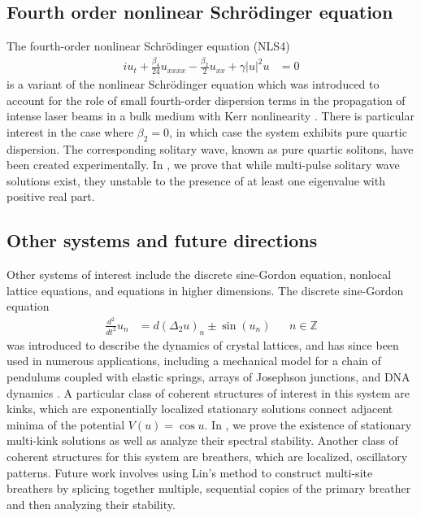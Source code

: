\documentclass[12pt,reqno,oneside,hidelinks]{article}
\begin{document}
\subsection*{Fourth order nonlinear Schr\"odinger equation}

The fourth-order nonlinear Schr{\"o}dinger equation (NLS4) 
\begin{align*}
    i u_t + \frac{\beta_4}{24}u_{xxxx} - \frac{\beta_2}{2}u_{xx} + \gamma |u|^2 u &= 0 
\end{align*}
is a variant of the nonlinear Schr{\"o}dinger equation which was introduced to account for the role of small fourth-order dispersion terms in the propagation of intense laser beams in a bulk medium with Kerr nonlinearity \cite{Karpman2000,Tam2020}. There is particular interest in the case where $\beta_2 = 0$, in which case the system exhibits pure quartic dispersion. The corresponding solitary wave, known as pure quartic solitons, have been created experimentally. In \cite{Parker2020NLS4}, we prove that while multi-pulse solitary wave solutions exist, they unstable to the presence of at least one eigenvalue with positive real part.

\subsection*{Other systems and future directions}

Other systems of interest include the discrete sine-Gordon equation, nonlocal lattice equations, and equations in higher dimensions. The discrete sine-Gordon equation
\begin{align*}
	\frac{d^2}{dt^2}u_n &= d (\Delta_2 u)_n \pm \sin(u_n) && n \in \mathbb{Z}
\end{align*}
was introduced to describe the dynamics of crystal lattices, and has since been used in numerous applications, including a mechanical model for a chain of pendulums coupled with elastic springs, arrays of Josephson junctions, and DNA dynamics \cite{braun2004}. A particular class of coherent structures of interest in this system are kinks, which are exponentially localized stationary solutions connect adjacent minima of the potential $V(u) = \cos u$. In \cite{parkerSG}, we prove the existence of stationary multi-kink solutions as well as analyze their spectral stability. Another class of coherent structures for this system are breathers, which are localized, oscillatory patterns. Future work involves using Lin's method to construct multi-site breathers by splicing together multiple, sequential copies of the primary breather and then analyzing their stability.
\end{document}
